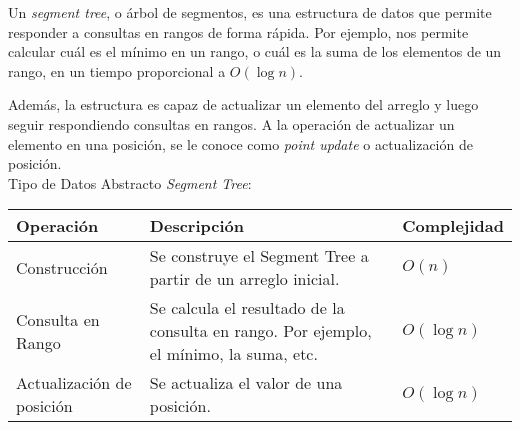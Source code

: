Un \textit{segment tree}, o \'arbol de segmentos, es una estructura de datos que permite responder a consultas en rangos de forma r\'apida. Por ejemplo, nos permite calcular cu\'al es el m\'inimo en un rango, o cu\'al es la suma de los elementos de un rango, en un tiempo proporcional a $O(\log n)$.

Adem\'as, la estructura es capaz de actualizar un elemento del arreglo y luego seguir respondiendo consultas en rangos. A la ope\-ra\-ci\'on de actualizar un elemento en una posici\'on, se le conoce como \textit{point update} o actualizaci\'on de posici\'on.\\

\noindent Tipo de Datos Abstracto \textit{Segment Tree}:
        \begin{center}
        
        \begin{tabular}{|p{2.0cm}|p{4cm}|p{1.8cm}|}    
        
        \hline
        
        Operaci\'on &
        Descripci\'on &
        Complejidad \\
            
        \hline
        
        Construcci\'on{} & 
        Se construye el Segment Tree a partir de un arreglo inicial. &
        $O(n)$\\
        
        \hline
        
        Consulta en Rango &
        
        Se calcula el resultado de la consulta en rango. Por ejemplo, el m\'inimo, la suma, etc. &
        
        $O(\log n)$ \\
        
        \hline
        
        Actualizaci\'on de posici\'on &
        Se actualiza el valor de una posici\'on. &
        $O(\log n)$ \\
        
        \hline
            
        \end{tabular}    
        \end{center}

